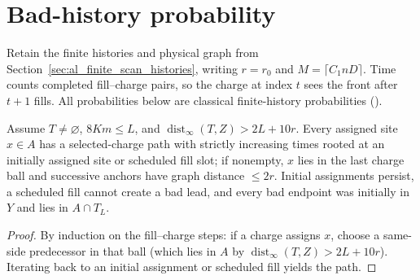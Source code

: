 \section{Bad-history probability}
\label{sec:al_scan_bad_histories}

Retain the finite histories and physical graph from Section~\ref{sec:al_finite_scan_histories}, writing $r=r_0$ and $M=\lceil C_1nD\rceil$. Time counts completed
fill--charge pairs, so the charge at index $t$ sees the front after $t+1$ fills.
All probabilities below are classical finite-history probabilities (\cite[Section~9, charge ancestry and availability]{OpenAI2026AreaLaw}).

\begin{lemma}
    \label{thm:al_scan_actual_ancestry}
    \leanok
    Assume $T\ne\varnothing$, $8Km\le L$, and $\operatorname{dist}_\infty(T,Z)>2L+10r$.
    Every assigned site $x\in A$ has a selected-charge path with strictly increasing times rooted at an initially assigned site or scheduled fill slot; if nonempty, $x$ lies in the last charge ball and successive anchors have graph distance $\le 2r$.
    Initial assignments persist, a scheduled fill cannot create a bad lead, and every bad endpoint was initially in $Y$ and lies in $A\cap T_L$.
\end{lemma}
\begin{proof}\leanok
    By induction on the fill--charge steps: if a charge assigns $x$, choose a same-side predecessor in that ball (which lies in $A$ by $\operatorname{dist}_\infty(T,Z)>2L+10r$). Iterating back to an initial assignment or scheduled fill yields the path.
\end{proof}

